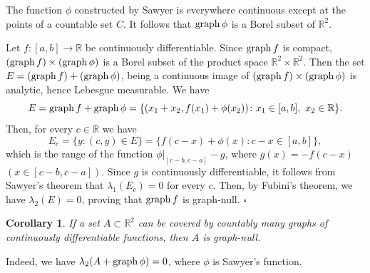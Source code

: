 \documentclass[12pt]{article}
\newtheorem{cor}[theorem]{Corollary}
\def\rr{{\mathbb R}}
\def\sik{{\rr}^2}
\def\su{\subset}
\def\la{\lambda}
\def\graph{{\rm graph}\, }
\begin{document}
The function $\phi$ constructed by Sawyer is everywhere continuous except at
the points of a countable set $C$. It follows that $\graph \phi$ is a Borel
subset of $\sik$.

Let $f\colon [a,b] \to \rr$ be continuously differentiable. Since 
$\graph f$ is compact, $(\graph f) \times (\graph \phi )$ 
is a Borel subset of the product space $\sik \times \sik$. Then the set
$E=(\graph f)+ ( \graph \phi )$, being a continuous image of $(\graph f) \times
(\graph \phi )$ is analytic, hence Lebesgue measurable. We have 
$$E= \graph f +\graph \phi =\{ (x_1 +x_2 , f(x_1 )+\phi (x_2 )) \colon
x_1 \in [a,b],\ x_2 \in \rr \} .$$
Then, for every $c\in \rr$ we have
$$E_c =\{ y\colon (c,y)\in E\} =\{ f(c-x)+\phi (x)\colon c-x\in [a,b]\} ,$$
which is the range of the function $\phi |_{[c-b,c-a]} -g$, where $g(x)=-f(c-x)$
$(x\in [c-b,c-a])$. Since $g$ is continuously differentiable, it follows
from Sawyer's theorem that $\la _1 (E_c )=0$ for every $c$. Then, by Fubini's
theorem, we have $\la _2 (E)=0$, proving that $\graph f$ is
graph-null. \hfill $\square$

\begin{cor}\label{c1}
If a set $A\su \sik$ can be covered by countably many graphs of 
continuously differentiable functions, then $A$ is graph-null.
\end{cor}
Indeed, we have $\la _2 (A+\graph \phi )=0$, where $\phi$ is Sawyer's function.
\end{document}

